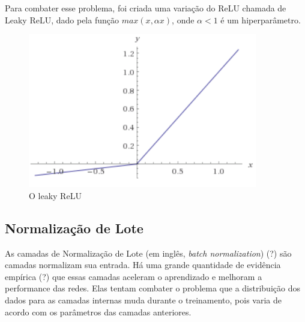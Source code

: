 Para combater esse problema, foi criada uma variação do ReLU chamada de Leaky ReLU, dado pela função $max(x, \alpha x)$, onde $\alpha < 1$ é um hiperparâmetro.

\begin{figure}[h!]
\centering
    \includegraphics[width=10cm]{figuras/lrelu.png}
    \caption{O leaky ReLU}
    \label{fig:relu}
\end{figure}

\subsection{Normalização de Lote}

As camadas de Normalização de Lote (em inglês, \textit{batch normalization}) (?) são camadas normalizam sua entrada. Há uma grande quantidade de evidência empírica (?) que essas camadas aceleram o aprendizado e melhoram a performance das redes. Elas tentam combater o problema que a distribuição dos dados para as camadas internas muda durante o treinamento, pois varia de acordo com os parâmetros das camadas anteriores.